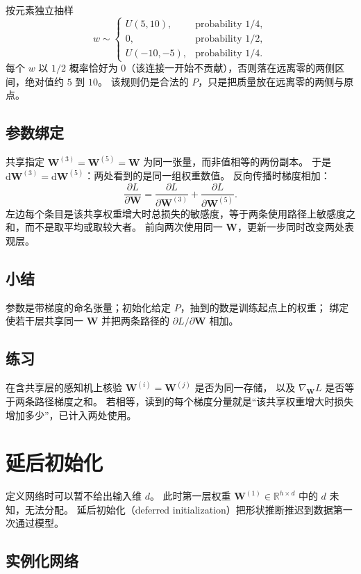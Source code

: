 按元素独立抽样
\[
w
\sim
\begin{cases}
U(5,10), & \text{probability }1/4,\\
0, & \text{probability }1/2,\\
U(-10,-5), & \text{probability }1/4.
\end{cases}
\]
每个 $w$ 以 $1/2$ 概率恰好为 $0$（该连接一开始不贡献），否则落在远离零的两侧区间，绝对值约 $5$ 到 $10$。
该规则仍是合法的 $P$，只是把质量放在远离零的两侧与原点。

\subsection{参数绑定}

共享指定 $\bm{W}^{(3)}=\bm{W}^{(5)}=\bm{W}$ 为同一张量，而非值相等的两份副本。
于是 $\mathrm{d}\bm{W}^{(3)}=\mathrm{d}\bm{W}^{(5)}$：两处看到的是同一组权重数值。
反向传播时梯度相加：
\[
\frac{\partial L}{\partial \bm{W}}
=
\frac{\partial L}{\partial \bm{W}^{(3)}}
+
\frac{\partial L}{\partial \bm{W}^{(5)}}.
\]
左边每个条目是该共享权重增大时总损失的敏感度，等于两条使用路径上敏感度之和，而不是取平均或取较大者。
前向两次使用同一 $\bm{W}$，更新一步同时改变两处表观层。

\subsection{小结}

参数是带梯度的命名张量；初始化给定 $P$，抽到的数是训练起点上的权重；
绑定使若干层共享同一 $\bm{W}$ 并把两条路径的 $\partial L/\partial\bm{W}$ 相加。

\subsection{练习}

在含共享层的感知机上核验 $\bm{W}^{(i)}=\bm{W}^{(j)}$ 是否为同一存储，
以及 $\nabla_{\bm{W}}L$ 是否等于两条路径梯度之和。
若相等，读到的每个梯度分量就是“该共享权重增大时损失增加多少”，已计入两处使用。

\section{延后初始化}

定义网络时可以暂不给出输入维 $d$。
此时第一层权重 $\bm{W}^{(1)}\in\mathbb{R}^{h\times d}$ 中的 $d$ 未知，无法分配。
延后初始化（deferred initialization）把形状推断推迟到数据第一次通过模型。

\subsection{实例化网络}

